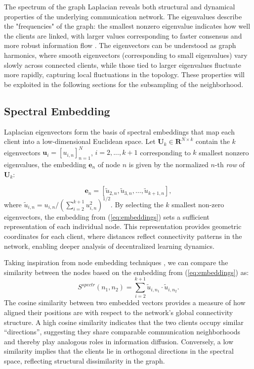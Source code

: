 \documentclass[journal]{IEEEtran}
\begin{document}
The spectrum of the graph Laplacian reveals both structural and dynamical properties of the underlying communication network. The eigenvalues describe the "frequencies" of the graph: the smallest nonzero eigenvalue indicates how well the clients are linked, with larger values corresponding to faster consensus and more robust information flow \cite{graph_theory}. The eigenvectors can be understood as graph harmonics, where smooth eigenvectors (corresponding to small eigenvalues) vary slowly across connected clients, while those tied to larger eigenvalues fluctuate more rapidly, capturing local fluctuations in the topology. These properties will be exploited in the following sections for the subsampling of the neighborhood.

\subsection{Spectral Embedding} 
Laplacian eigenvectors form the basis of spectral embeddings that map each client into a low-dimensional Euclidean space. Let $\mathbf{U}_k \in \mathbf{R}^{N \times k}$ contain the $k$ eigenvectors $\mathbf{u}_i=[u_{i,n}]_{n=1}^{N}$, $i=2, ...,k+1$ corresponding to $k$ smallest nonzero eigenvalues, the embedding $\mathbf{e}_n$ of node $n$ is given by the normalized $n$-th \textit{row} of $\mathbf{U}_k$:

\begin{equation} 
    \mathbf{e}_n = [\tilde{u}_{2,n}, \tilde{u}_{3,n}, \dots, \tilde{u}_{k+1,n}], 
\label{eq:embeddings}
\end{equation} 
where $\tilde{u}_{i,n} = u_{i,n}/(\sum_{i=2}^{k+1} u_{i,n}^2 )^{1/2}$. 
By selecting the $k$ smallest non-zero eigenvectors, the embedding from (\ref{eq:embeddings}) sets a sufficient representation of each individual node. This representation provides geometric coordinates for each client, where distances reflect connectivity patterns in the network, enabling deeper analysis of decentralized learning dynamics. 

Taking inspiration from node embedding techniques \cite{deepwalk, node2vec}, we can compare the similarity between the nodes based on the embedding from (\ref{eq:embeddings}) as:
\begin{equation} \label{eq:cos_sim}
    S^{spectr}(n_1, n_2) = \sum_{i=2}^{k+1}  \tilde{u}_{i,n_1} \cdot \tilde{u}_{i,n_2}.
\end{equation}
The cosine similarity between two embedded vectors provides a measure of how aligned their positions are with respect to the network's global connectivity structure. A high cosine similarity indicates that the two clients occupy similar “directions”, suggesting they share comparable communication neighborhoods and thereby play analogous roles in information diffusion. Conversely, a low similarity implies that the clients lie in orthogonal directions in the spectral space, reflecting structural dissimilarity in the graph.
\end{document}

